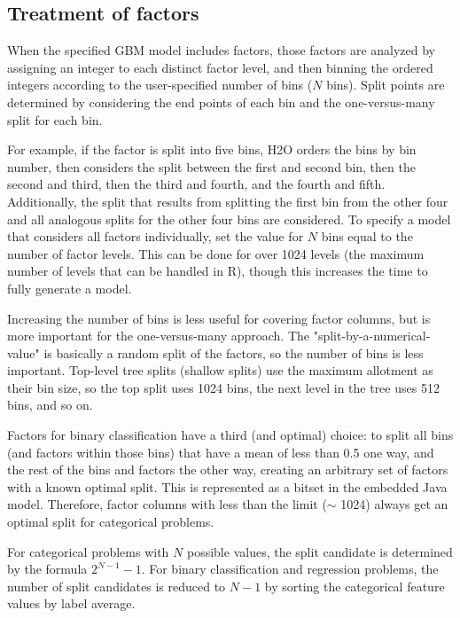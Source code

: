 {\subsection{Treatment of factors}

When the specified GBM model includes factors, those factors are analyzed by assigning an integer to each distinct factor level, and then binning the ordered integers according to the user-specified number of bins ($N$ bins). Split points are determined by considering the end points of each bin and the one-versus-many split for each bin. 

For example, if the factor is split into five bins, H2O orders the bins by bin number, then considers the split between the first and second bin, then the second and third, then the third and fourth, and the fourth and fifth. Additionally, the split that results from splitting the first bin from the other four and all analogous splits for the other four bins are considered. To specify a model that considers all factors individually, set the value for $N$ bins equal to the number of factor levels. This can be done for over 1024 levels (the maximum number of levels that can be handled in R), though this increases the time to fully generate a model. 

Increasing the number of bins is less useful for covering factor columns, but is more important for the one-versus-many approach. The "split-by-a-numerical-value" is basically a random split of the factors, so the number of bins is less important. Top-level tree splits (shallow splits) use the maximum allotment as their bin size, so the top split uses 1024 bins, the next level in the tree uses 512 bins, and so on. 

Factors for binary classification have a third (and optimal) choice: to split all bins (and factors within those bins) that have a mean of less than 0.5 one way, and the rest of the bins and factors the other way, creating an arbitrary set of factors with a known optimal split. This is represented as a bitset in the embedded Java model. Therefore, factor columns with less than the limit ($\mathtt{\sim}$ 1024) always get an optimal split for categorical problems. 

For categorical problems with $N$ possible values, the split candidate is determined by the formula $2^{N-1}-1$. For binary classification and regression problems, the number of split candidates is reduced to $N-1$ by sorting the categorical feature values by label average. 


}
